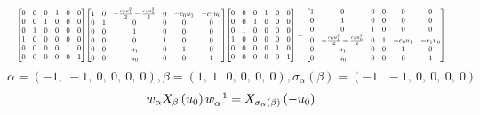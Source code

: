 \documentclass[11pt]{article}
\theoremstyle{definition}
\begin{document}
\[
\scaletoalign{\textwidth}{{\left[\begin{matrix}0 & 0 & 0 & 1 & 0 & 0\\0 & 0 & 1 & 0 & 0 & 0\\0 & 1 & 0 & 0 & 0 & 0\\1 & 0 & 0 & 0 & 0 & 0\\0 & 0 & 0 & 0 & 1 & 0\\0 & 0 & 0 & 0 & 0 & 1\end{matrix}\right]} {\left[\begin{matrix}1 & 0 & - \frac{c_{0} u_{1}^{2}}{2} - \frac{c_{1} u_{0}^{2}}{2} & 0 & - c_{0} u_{1} & - c_{1} u_{0}\\0 & 1 & 0 & 0 & 0 & 0\\0 & 0 & 1 & 0 & 0 & 0\\0 & 0 & 0 & 1 & 0 & 0\\0 & 0 & u_{1} & 0 & 1 & 0\\0 & 0 & u_{0} & 0 & 0 & 1\end{matrix}\right]} {\left[\begin{matrix}0 & 0 & 0 & 1 & 0 & 0\\0 & 0 & 1 & 0 & 0 & 0\\0 & 1 & 0 & 0 & 0 & 0\\1 & 0 & 0 & 0 & 0 & 0\\0 & 0 & 0 & 0 & 1 & 0\\0 & 0 & 0 & 0 & 0 & 1\end{matrix}\right]} = {\left[\begin{matrix}1 & 0 & 0 & 0 & 0 & 0\\0 & 1 & 0 & 0 & 0 & 0\\0 & 0 & 1 & 0 & 0 & 0\\0 & - \frac{c_{0} u_{1}^{2}}{2} - \frac{c_{1} u_{0}^{2}}{2} & 0 & 1 & - c_{0} u_{1} & - c_{1} u_{0}\\0 & u_{1} & 0 & 0 & 1 & 0\\0 & u_{0} & 0 & 0 & 0 & 1\end{matrix}\right]}}
\]
\[
\alpha = \left( -1, \  -1, \  0, \  0, \  0, \  0\right), \beta = \left( 1, \  1, \  0, \  0, \  0, \  0\right), \sigma_{\alpha}(\beta) = \left( -1, \  -1, \  0, \  0, \  0, \  0\right)
\]
\[
\scaletoalign{\textwidth}{w_{\alpha} X_{\beta}\left(u_{0}\right) w_{\alpha}^{-1} = X_{\sigma_{\alpha}\left(\beta\right)}\left(- u_{0}\right)}
\]
\end{document}

